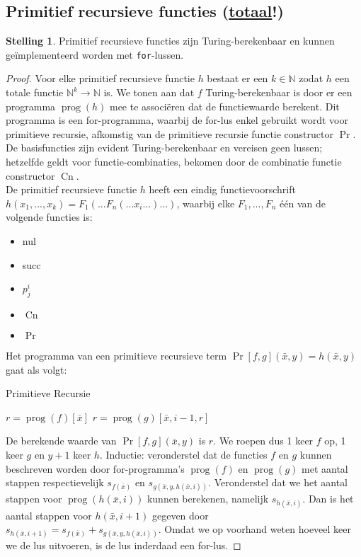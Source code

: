 \documentclass[kulak]{kulakarticle}
\newcommand{\N}{\mathbb{N}}
\DeclareMathOperator{\prog}{prog}
\DeclareMathOperator{\pr}{Pr}
\DeclareMathOperator{\cn}{Cn}
\theoremstyle{definition}
\newtheorem*{stelling}{Stelling}
\begin{document}
	\subsection*{Primitief recursieve functies (\underline{totaal}!)}

	\begin{stelling}
		Primitief recursieve functies zijn Turing-berekenbaar en kunnen geïmplementeerd worden met \texttt{for}-lussen.
	\end{stelling}

	\begin{proof}
		Voor elke primitief recursieve functie \( h \) bestaat er een \(k\in\N\) zodat \(h\) een totale functie \( \N^k\to\N \) is. We tonen aan dat \(f\) Turing-berekenbaar is door er een programma \(\prog(h)\) mee te associëren dat de functiewaarde berekent. Dit programma is een for-programma, waarbij de for-lus enkel gebruikt wordt voor primitieve recursie, afkomstig van de primitieve recursie functie constructor \(\pr\). De basisfuncties zijn evident Turing-berekenbaar en vereisen geen lussen; hetzelfde geldt voor functie-combinaties, bekomen door de combinatie functie constructor \( \cn \).
		\hfill\\

		De primitief recursieve functie \( h \) heeft een eindig functievoorschrift \(h(x_1,...,x_k) = F_1(...F_n(...x_i...)...)\), waarbij elke \(F_1,...,F_n\) één van de volgende functies is:
		\begin{itemize}
			\item nul
			\item succ
			\item \(p^i_j\)
			\item \( \cn \)
			\item \( \pr \)
		\end{itemize}

		Het programma van een primitieve recursieve term \( \pr[f,g](\bar{x},y)=h(\bar{x},y) \) gaat als volgt:

		\begin{algorithm}
			\caption{Primitieve Recursie}
			\begin{algorithmic}[1]
						\State $r=\prog(f)[\bar{x}]$
					\Else
						\State $r=\prog(g)[\bar{x}, i-1, r]$
					\EndIf
				\EndFor
			\end{algorithmic}
		\end{algorithm}

		De berekende waarde van \(\pr[f,g](\bar{x},y)\) is \(r\). We roepen dus 1 keer \(f\) op, 1 keer \(g\) en \(y+1\) keer \(h\). Inductie: veronderstel dat de functies \(f\) en \(g\) kunnen beschreven worden door for-programma's \(\prog(f)\) en \(\prog(g)\) met aantal stappen respectievelijk \(s_{f(\bar{x})}\) en \(s_{g(\bar{x},y,h(\bar{x},i))}\). Veronderstel dat we het aantal stappen voor \(\prog(h(\bar{x},i))\) kunnen berekenen, namelijk \(s_{h(\bar{x},i)}\). Dan is het aantal stappen voor \(h(\bar{x},i+1)\) gegeven door \(s_{h(\bar{x},i+1)}=s_{f(\bar{x})}+s_{g(\bar{x},y,h(\bar{x},i))}\). Omdat we op voorhand  weten hoeveel keer we de lus uitvoeren, is de lus inderdaad een for-lus.
	\end{proof}
\end{document}
